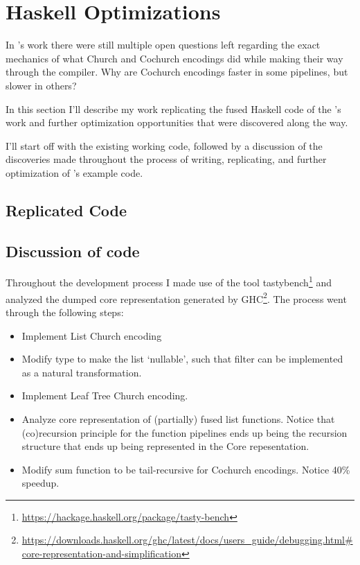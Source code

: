 
\section{Haskell Optimizations}\label{sec:haskell}
In \cite{Harper2011}'s work there were still multiple open questions left regarding the exact mechanics of what Church and Cochurch encodings did while making their way through the compiler. Why are Cochurch encodings faster in some pipelines, but slower in others?

In this section I'll describe my work replicating the fused Haskell code of the \cite{Harper2011}'s work and further optimization opportunities that were discovered along the way.

I'll start off with the existing working code, followed by a discussion of the discoveries made throughout the process of writing, replicating, and further optimization of \cite{Harper2011}'s example code.

\subsection{Replicated Code}


\subsection{Discussion of code}
Throughout the development process I made use of the tool tastybench\footnote{\url{https://hackage.haskell.org/package/tasty-bench}} and analyzed the dumped core representation generated by GHC\footnote{\url{https://downloads.haskell.org/ghc/latest/docs/users_guide/debugging.html\#core-representation-and-simplification}}.
The process went through the following steps:
\begin{itemize}
    \item Implement List Church encoding
    \item Modify type to make the list `nullable', such that filter can be implemented as a natural transformation.
    \item Implement Leaf Tree Church encoding.
    \item Analyze core representation of (partially) fused list functions. Notice that (co)recursion principle for the function pipelines ends up being the recursion structure that ends up being represented in the Core repesentation.
    \item Modify sum function to be tail-recursive for Cochurch encodings. Notice 40\% speedup.
\end{itemize}
